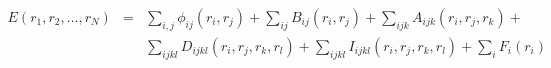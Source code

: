\documentclass[12pt]{article}
\begin{document}
\begin{eqnarray*}
E(r_1,r_2, \ldots ,r_N) & = & \sum_{i,j} \phi_{ij}(r_i,r_j) + 
                              \sum_{ij} B_{ij}(r_i,r_j) +
                              \sum_{ijk} A_{ijk}(r_i,r_j,r_k) + \\
                           && \sum_{ijkl} D_{ijkl}(r_i,r_j,r_k,r_l) +
                              \sum_{ijkl} I_{ijkl}(r_i,r_j,r_k,r_l) +
                              \sum_i F_i(r_i) 
\end{eqnarray*}
\end{document}
